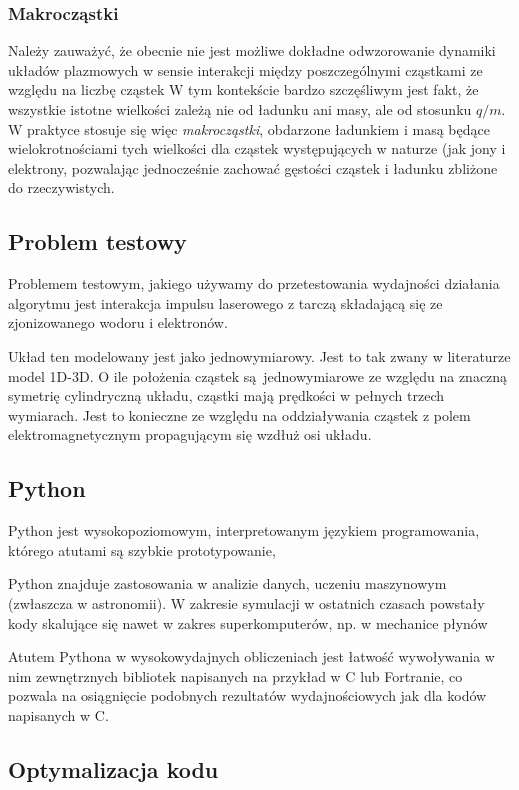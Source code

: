 \subsubsection{Makrocząstki}
Należy zauważyć, że obecnie nie jest możliwe dokładne odwzorowanie dynamiki układów plazmowych w sensie interakcji
między poszczególnymi cząstkami ze względu na liczbę cząstek %
W tym kontekście bardzo szczęśliwym jest fakt, że wszystkie istotne wielkości zależą nie od ładunku ani masy,
ale od stosunku $q/m$. W praktyce stosuje się więc \emph{makrocząstki}, obdarzone ładunkiem i masą będące wielokrotnościami
tych wielkości dla cząstek występujących w naturze (jak jony i elektrony, pozwalając jednocześnie zachować gęstości
cząstek i ładunku %
zbliżone do rzeczywistych.

\subsection{Problem testowy}

Problemem testowym, jakiego używamy do przetestowania wydajności działania algorytmu jest
interakcja impulsu laserowego z tarczą składającą się ze zjonizowanego wodoru i elektronów.

Układ ten modelowany jest jako jednowymiarowy. Jest to tak zwany w literaturze model 1D-3D. O ile położenia cząstek
są jednowymiarowe ze względu na znaczną symetrię
cylindryczną układu, cząstki mają prędkości w pełnych trzech wymiarach. Jest to konieczne ze względu
na oddziaływania cząstek z polem elektromagnetycznym propagującym się wzdłuż osi układu.

\subsection{Python}
Python jest wysokopoziomowym, interpretowanym językiem programowania, którego atutami są szybkie prototypowanie,

Python znajduje zastosowania w analizie danych, uczeniu maszynowym (zwłaszcza w astronomii). W zakresie symulacji
w ostatnich czasach powstały kody skalujące się nawet w zakres superkomputerów, np. w mechanice płynów %

Atutem Pythona w wysokowydajnych obliczeniach jest łatwość wywoływania w nim zewnętrznych bibliotek napisanych
na przykład w C lub Fortranie, co pozwala na osiągnięcie podobnych rezultatów wydajnościowych jak dla kodów
napisanych w C.

\subsection{Optymalizacja kodu}


